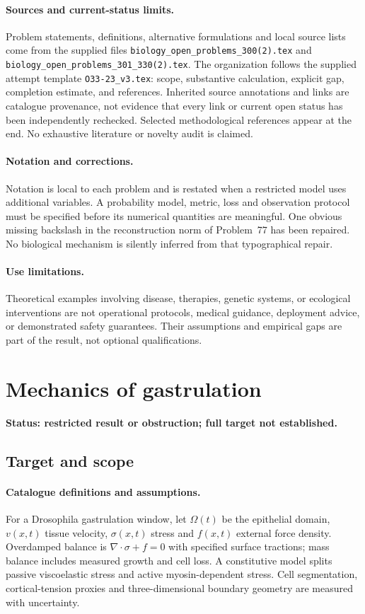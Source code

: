 \documentclass[11pt]{article}
\begin{document}
\paragraph{Sources and current-status limits.}
Problem statements, definitions, alternative formulations and local source lists
come from the supplied files
\texttt{biology\_open\_problems\_300(2).tex} and
\texttt{biology\_open\_problems\_301\_330(2).tex}.
The organization follows the supplied attempt template
\texttt{O33-23\_v3.tex}: scope, substantive calculation, explicit gap,
completion estimate, and references. Inherited source annotations and links are
catalogue provenance, not evidence that every link or current open status has
been independently rechecked. Selected methodological references appear at the
end. No exhaustive literature or novelty audit is claimed.

\paragraph{Notation and corrections.}
Notation is local to each problem and is restated when a restricted model uses
additional variables. A probability model, metric, loss and observation protocol
must be specified before its numerical quantities are meaningful. One obvious
missing backslash in the reconstruction norm of Problem~77 has been repaired.
No biological mechanism is silently inferred from that typographical repair.

\paragraph{Use limitations.}
Theoretical examples involving disease, therapies, genetic systems, or ecological
interventions are not operational protocols, medical guidance, deployment advice,
or demonstrated safety guarantees. Their assumptions and empirical gaps are part
of the result, not optional qualifications.


\section*{Mechanics of gastrulation}
\label{prob:126}
\noindent\textbf{Status: restricted result or obstruction; full target not established.}
\subsection{Target and scope}
\paragraph{Catalogue definitions and assumptions.}
For a Drosophila gastrulation window, let $\Omega(t)$ be the epithelial domain, $v(x,t)$ tissue velocity, $\sigma(x,t)$ stress and $f(x,t)$ external force density. Overdamped balance is $\nabla\!\cdot\sigma+f=0$ with specified surface tractions; mass balance includes measured growth and cell loss. A constitutive model splits passive viscoelastic stress and active myosin-dependent stress. Cell segmentation, cortical-tension proxies and three-dimensional boundary geometry are measured with uncertainty.
\end{document}
